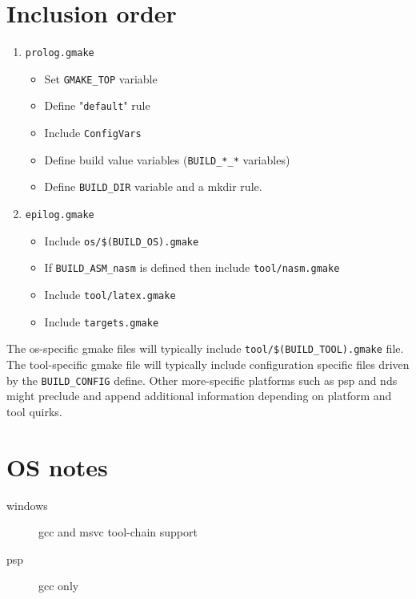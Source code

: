 \documentclass{article}
\newcommand{\var}[1]{{\tt #1}}
\newcommand{\val}[1]{"{\tt #1}"}
\newcommand{\file}[1]{{\tt #1}}
\begin{document}
\pagebreak

\section{Inclusion order}

\begin{enumerate}
\item \file{prolog.gmake}
\begin{itemize}
\item Set \var{GMAKE\_TOP} variable
\item Define \val{default} rule
\item Include \file{ConfigVars}
\item Define build value variables (\var{BUILD\_*\_*} variables)
\item Define \var{BUILD\_DIR} variable and a mkdir rule.
\end{itemize}
\item \file{epilog.gmake}
\begin{itemize}
\item Include \file{os/\$(\var{BUILD\_OS}).gmake}
\item If \var{BUILD\_ASM\_nasm} is defined then include \file{tool/nasm.gmake}
\item Include \file{tool/latex.gmake}
\item Include \file{targets.gmake}
\end{itemize}
\end{enumerate}

The os-specific gmake files will typically include 
\file{tool/\$(\var{BUILD\_TOOL}).gmake} file. 
The tool-specific gmake file will typically include configuration specific files driven by the \var{BUILD\_CONFIG} define.
Other more-specific platforms such as psp and nds might preclude and append additional information
depending on platform and tool quirks.

\section{OS notes}

\begin{description}
\item [windows] gcc and msvc tool-chain support
\item [psp] gcc only
\end{description}
\end{document}
